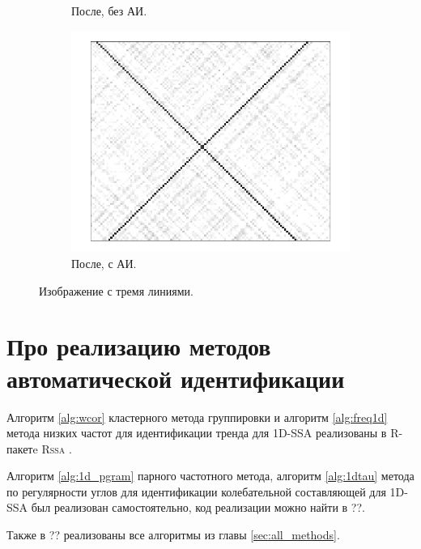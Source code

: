 \documentclass[specialist,
               substylefile = spbu.rtx,
               subf,href,colorlinks=true, 12pt]{disser}
\begin{document}
\begin{figure}[hhh!]
\begin{subfigure}[b]{0.32\textwidth}
        \caption{После, без АИ.}
        \label{fig:a_many_after}
    \end{subfigure}
     \begin{subfigure}[b]{0.32\textwidth}
       \includegraphics[width=\textwidth]{auto_lines}
        \caption{После, с АИ.}
        \label{fig:a_many_after2}
    \end{subfigure}
       \caption{Изображение с тремя линиями.}\label{fig:a_many}
\end{figure}

\chapter{Про реализацию методов автоматической идентификации}
Алгоритм \ref{alg:wcor} кластерного метода группировки и алгоритм \ref{alg:freq1d} метода низких частот для идентификации тренда для 1D-SSA  реализованы в R-пакетe \textsc{Rssa} \cite{Rssa, Golyandina.Korobeynikov2013}.

Алгоритм \ref{alg:1d_pgram} парного частотного метода, алгоритм \ref{alg:1dtau} метода по регулярности углов для идентификации колебательной составляющей для 1D-SSA был реализован самостоятельно, код реализации можно найти в ??.

Также в ?? реализованы все алгоритмы из главы \ref{sec:all_methods}.
\end{document}
